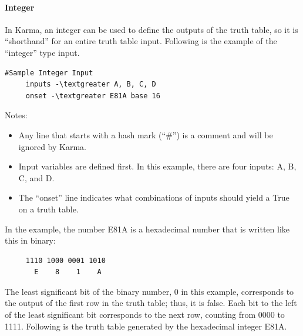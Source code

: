 \paragraph{Integer}

In Karma, an integer can be used to define the outputs of the truth table, so it is ``shorthand'' for an entire truth table input. Following is the example of the ``integer'' type input.

\begin{Verbatim}[commandchars=\\\{\}]
     #Sample Integer Input 
     inputs -\textgreater A, B, C, D 
     onset -\textgreater E81A base 16
\end{Verbatim}

Notes:

\begin{itemize}
	\item Any line that starts with a hash mark (``\#'') is a comment and will be ignored by Karma.
	\item Input variables are defined first. In this example, there are four inputs: A, B, C, and D.
	\item The ``onset'' line indicates what combinations of inputs should yield a True on a truth table. 
\end{itemize}

In the example, the number E81A is a hexadecimal number that is written like this in binary:

\begin{verbatim}
     1110 1000 0001 1010 
       E    8    1    A
\end{verbatim}

The least significant bit of the binary number, 0 in this example, corresponds to the output of the first row in the truth table; thus, it is false. Each bit to the left of the least significant bit corresponds to the next row, counting from 0000 to 1111. Following is the truth table generated by the hexadecimal integer E81A.

